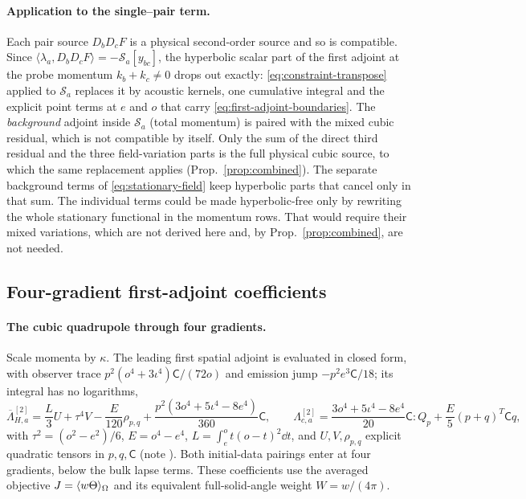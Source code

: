\paragraph{Application to the single--pair term.} Each pair source $D_bD_cF$ is a physical
second-order source and so is compatible. Since
$\langle\lambda_a,D_bD_cF\rangle=-\mathcal S_a[y_{bc}]$, the hyperbolic scalar part of the first adjoint
at the probe momentum $k_b+k_c\neq0$ drops out exactly: \eqref{eq:constraint-transpose} applied
to $\mathcal S_a$ replaces it by acoustic kernels, one cumulative integral and the explicit point
terms at $e$ and $o$ that carry \eqref{eq:first-adjoint-boundaries}. The \emph{background}
adjoint inside $\mathcal S_a$ (total momentum) is paired with the mixed cubic residual, which is
not compatible by itself. Only the sum of the direct third residual and the three field-variation
parts is the full physical cubic source, to which the same replacement applies
(Prop.~\ref{prop:combined}). The separate background terms of \eqref{eq:stationary-field} keep
hyperbolic parts that cancel only in that sum. The individual terms could be made hyperbolic-free
only by rewriting the whole stationary functional in the momentum rows. That would require their
mixed variations, which are not derived here and, by Prop.~\ref{prop:combined}, are not needed.

\subsection{Four-gradient first-adjoint coefficients}
\paragraph{The cubic quadrupole through four gradients.} Scale momenta by $\kappa$. The leading
first spatial adjoint is evaluated in closed form, with observer trace
$p^2(o^4+3\iota^4)\mathsf C/(72o)$ and emission jump $-p^2e^3\mathsf C/18$; its integral has no
logarithms,
\[
 \overline\Lambda_{H,a}^{[2]}=\frac L3U+\tau^4V-\frac E{120}\rho_{p,q}
 +\frac{p^2(3o^4+5\iota^4-8e^4)}{360}\mathsf C,\qquad
 \Lambda^{[2]}_{c,a}=\frac{3o^4+5\iota^4-8e^4}{20}\mathsf C:Q_p+\frac E5(p+q)^T\mathsf Cq,
\]
with $\tau^2=(o^2-e^2)/6$, $E=o^4-e^4$, $L=\int_e^ot(o-t)^2\dd t$, and $U,V,\rho_{p,q}$ explicit
quadratic tensors in $p,q,\mathsf C$ (note ). Both
initial-data pairings enter at four gradients, below the bulk lapse terms.
These coefficients use the averaged objective $J=\langle w\Theta\rangle_{\Omega}$ and its
equivalent full-solid-angle weight $W=w/(4\pi)$.
